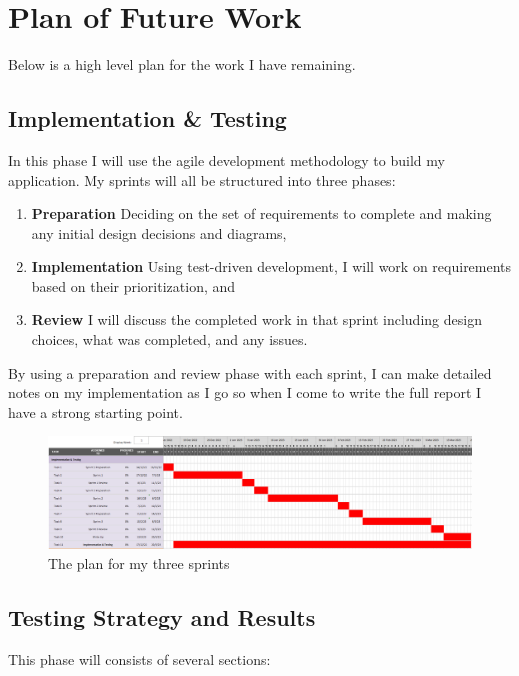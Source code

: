 \section{Plan of Future Work}

Below is a high level plan for the work I have remaining. 

\subsection*{Implementation \& Testing}
In this phase I will use the agile development methodology to build my application. My sprints will all be structured into three phases:
\vspace{1mm}

\begin{enumerate}
  \item \textbf{Preparation} Deciding on the set of requirements to complete and making any initial design decisions and diagrams,
  \item \textbf{Implementation} Using test-driven development, I will work on requirements based on their prioritization, and
  \item \textbf{Review} I will discuss the completed work in that sprint including design choices, what was completed, and any issues.  
\end{enumerate}

\vspace{1mm}\noindent By using a preparation and review phase with each sprint, I can make detailed notes on my implementation as I go so when I come to write the full report I have a strong starting point.

\begin{figure}[ht]
  \centering
  \includegraphics[width=\textwidth]{assets/images/charts/gantt/implementation-testing.png}
  \caption{The plan for my three sprints}
\end{figure}

\subsection*{Testing Strategy and Results}
This phase will consists of several sections:


